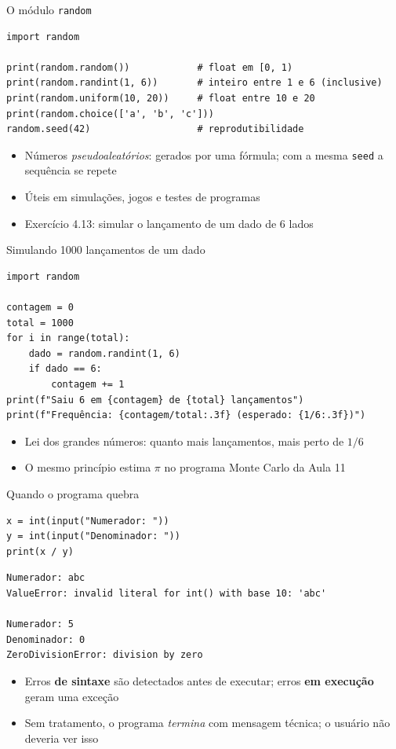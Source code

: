 \documentclass[aspectratio=169,10pt,t]{beamer}
\begin{document}
\begin{frame}[fragile]{O módulo \texttt{random}}
\begin{lstlisting}
import random

print(random.random())            # float em [0, 1)
print(random.randint(1, 6))       # inteiro entre 1 e 6 (inclusive)
print(random.uniform(10, 20))     # float entre 10 e 20
print(random.choice(['a', 'b', 'c']))
random.seed(42)                   # reprodutibilidade
\end{lstlisting}
  \begin{itemize}
    \item Números \emph{pseudoaleatórios}: gerados por uma fórmula; com a mesma \texttt{seed} a sequência se repete
    \item Úteis em simulações, jogos e testes de programas
    \item Exercício 4.13: simular o lançamento de um dado de 6 lados
  \end{itemize}
\end{frame}

\begin{frame}[fragile]{Simulando 1000 lançamentos de um dado}
\begin{lstlisting}
import random

contagem = 0
total = 1000
for i in range(total):
    dado = random.randint(1, 6)
    if dado == 6:
        contagem += 1
print(f"Saiu 6 em {contagem} de {total} lançamentos")
print(f"Frequência: {contagem/total:.3f} (esperado: {1/6:.3f})")
\end{lstlisting}
  \begin{itemize}
    \item \alert{Lei dos grandes números}: quanto mais lançamentos, mais perto de \(1/6\)
    \item O mesmo princípio estima \(\pi\) no programa Monte Carlo da Aula 11
  \end{itemize}
\end{frame}

\begin{frame}[fragile]{Quando o programa quebra}
\begin{lstlisting}
x = int(input("Numerador: "))
y = int(input("Denominador: "))
print(x / y)
\end{lstlisting}
\begin{lstlisting}[style=saida,basicstyle=\ttfamily\scriptsize]
Numerador: abc
ValueError: invalid literal for int() with base 10: 'abc'

Numerador: 5
Denominador: 0
ZeroDivisionError: division by zero
\end{lstlisting}
  \begin{itemize}
    \item Erros \textbf{de sintaxe} são detectados antes de executar; erros \textbf{em execução} geram uma \alert{exceção}
    \item Sem tratamento, o programa \emph{termina} com mensagem técnica; o usuário não deveria ver isso
  \end{itemize}
\end{frame}
\end{document}
